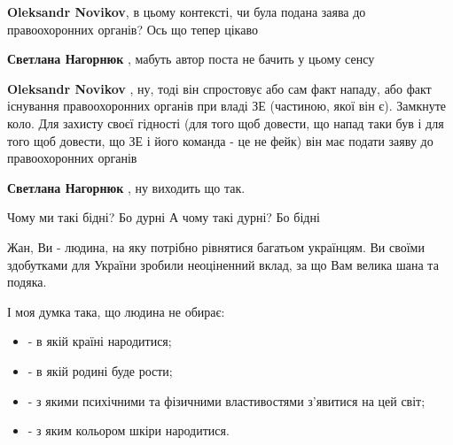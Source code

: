 \begin{itemize}
\begin{itemize}
 
\textbf{Oleksandr Novikov}, в цьому контексті, чи була подана заява до правоохоронних органів? Ось що тепер цікаво

 
\textbf{Светлана Нагорнюк} , мабуть автор поста не бачить у цьому сенсу 🤔

 
\textbf{Oleksandr Novikov} , ну, тоді він спростовує або сам факт нападу, або
факт існування правоохоронних органів при владі ЗЕ (частиною, якої він є).
Замкнуте коло. Для захисту своєї гідності (для того щоб довести, що напад таки
був і для того щоб довести, що ЗЕ і його команда - це не фейк) він має подати
заяву до правоохоронних органів

 
\textbf{Светлана Нагорнюк} , ну виходить що так.

\obeycr
Чому ми такі бідні?
Бо дурні
А чому такі дурні?
Бо бідні
\restorecr
\end{itemize}


Жан, Ви - людина, на яку потрібно рівнятися багатьом українцям. Ви своїми
здобутками для України зробили неоціненний вклад, за що Вам велика шана та
подяка.

І моя думка така, що людина не обирає:

\begin{itemize}
  \item - в якій країні народитися;
  \item - в якій родині буде рости;
  \item - з якими психічними та фізичними властивостями з'явитися на цей світ;
  \item - з яким кольором шкіри народитися.
\end{itemize}


\end{itemize}
